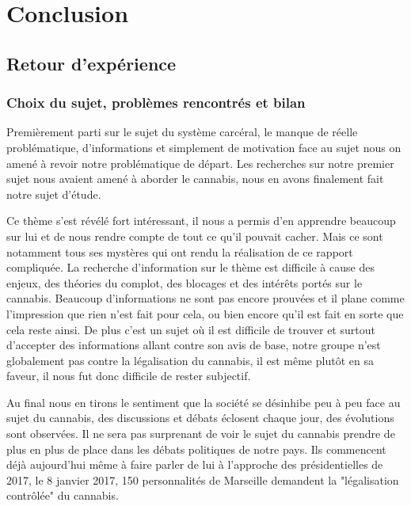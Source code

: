 \chapter*{Conclusion}

\section*{Retour d'expérience}

\subsection*{Choix du sujet, problèmes rencontrés et bilan}

Premièrement parti sur le sujet du système carcéral, le manque de réelle problématique, d’informations et simplement de motivation face au sujet nous on amené à revoir notre problématique de départ. Les recherches sur notre premier sujet nous avaient amené à aborder le cannabis, nous en avons finalement fait notre sujet d’étude. 

Ce thème s’est révélé fort intéressant, il nous a permis d’en apprendre beaucoup sur lui et de nous rendre compte de tout ce qu’il pouvait cacher. Mais ce sont notamment tous ses mystères qui ont rendu la réalisation de ce rapport compliquée. La recherche d’information sur le thème est difficile à cause des enjeux, des théories du complot, des blocages et des intérêts portés sur le cannabis. Beaucoup d’informations ne sont pas encore prouvées et il plane comme l’impression que rien n’est fait pour cela, ou bien encore qu’il est fait en sorte que cela reste ainsi. De plus c’est un sujet où il est difficile de trouver et surtout d’accepter des informations allant contre son avis de base, notre groupe n’est globalement pas contre la légalisation du cannabis, il est même plutôt en sa faveur, il nous fut donc difficile de rester subjectif. 

Au final nous en tirons le sentiment que la société se désinhibe peu à peu face au sujet du cannabis, des discussions et débats éclosent chaque jour, des évolutions sont observées. Il ne sera pas surprenant de voir le sujet du cannabis prendre de plus en plus de place dans les débats politiques de notre pays. Ils commencent déjà aujourd’hui même à faire parler de lui à l’approche des présidentielles de 2017, le 8 janvier 2017, 150 personnalités de Marseille demandent la "légalisation contrôlée" du cannabis.



